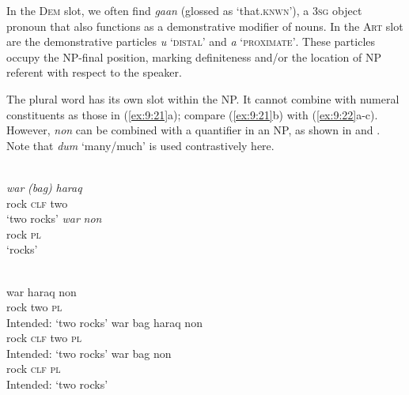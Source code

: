
In the \textsc{Dem} slot, we often find \textit{ga}\textit{{\textglotstop}}\textit{an} (glossed as `that.\textsc{knwn}'), a 3\textsc{sg} object pronoun that also functions as a demonstrative modifier of nouns. In the \textsc{Art} slot are the demonstrative particles \textit{u} `\textsc{distal'} and \textit{a} `\textsc{proximate'}. These particles occupy the NP-final position, marking definiteness and/or the location of NP referent with respect to the speaker.

The plural word has its own slot within the NP. It cannot combine with numeral constituents as those in (\ref{ex:9:21}a); compare (\ref{ex:9:21}b) with (\ref{ex:9:22}a-c). However, \textit{non} can be combined with a quantifier in an NP, as shown in  and . Note that \textit{dum} `many/much' is used contrastively here.


\ea%
\label{ex:9:21}
 \\
\ea
\gll \textit{war} \textit{(bag)} \textit{haraq}  \\
  rock \textsc{clf} two \\
\glt `two rocks'
\ex
\gll \textit{war} \textit{non}\\
  rock \textsc{pl}\\
\glt `rocks'
\z
\z


\ea%
\label{ex:9:22}
 \\
\ea
\gll  *war haraq non \\
  rock two \textsc{pl}   \\
\glt Intended: `two rocks'
\ex
\gll *war bag haraq non \\
  rock \textsc{clf} two \textsc{pl}   \\
\glt  Intended: `two rocks'
\ex
\gll *war bag non \\
   rock \textsc{clf} \textsc{pl}  \\
\glt Intended: `two rocks'
\z
\z





